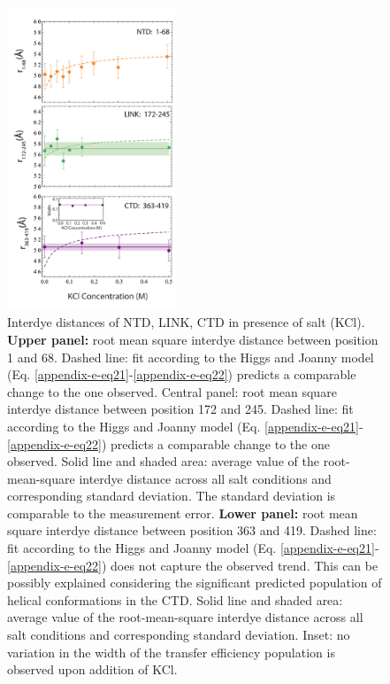 \documentclass[../main.tex]{subfiles}
\begin{document}
        \begin{figure}[!htb] %
            \centering
            \includegraphics[width=2in]{appendix-e-fig10.png}
            \caption[Interdye distances of NTD, LINK, CTD in presence of salt (KCl).]
                {Interdye distances of NTD, LINK, CTD in presence of salt (KCl). \textbf{Upper panel:} root mean square interdye distance between position 1 and 68. Dashed line: fit according to the Higgs and Joanny model (Eq. \ref{appendix-e-eq21}-\ref{appendix-e-eq22}) predicts a comparable change to the one observed. Central panel: root mean square interdye distance between position 172 and 245. Dashed line: fit according to the Higgs and Joanny model (Eq. \ref{appendix-e-eq21}-\ref{appendix-e-eq22}) predicts a comparable change to the one observed. Solid line and shaded area: average value of the root-mean-square interdye distance across all salt conditions and corresponding standard deviation. The standard deviation is comparable to the measurement error. \textbf{Lower panel:} root mean square interdye distance between position 363 and 419. Dashed line: fit according to the Higgs and Joanny model (Eq. \ref{appendix-e-eq21}-\ref{appendix-e-eq22}) does not capture the observed trend. This can be possibly explained considering the significant predicted population of helical conformations in the CTD. Solid line and shaded area: average value of the root-mean-square interdye distance across all salt conditions and corresponding standard deviation. Inset: no variation in the width of the transfer efficiency population is observed upon addition of KCl.}
            \label{fig:appendix-e-fig10}
        \end{figure}
\end{document}
